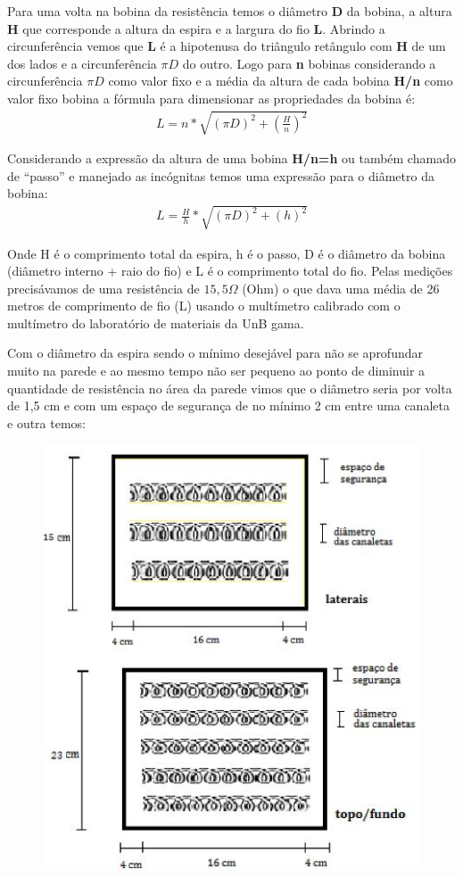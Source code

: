 Para uma volta na bobina da resistência temos o diâmetro \textbf{D} da bobina, a altura \textbf{H} que corresponde a altura da espira e a largura do fio \textbf{L}. Abrindo a circunferência vemos que \textbf{L} é a hipotenusa do triângulo retângulo com \textbf{H} de um dos lados e a circunferência \textbf{$\pi D$} do outro.
Logo para \textbf{n} bobinas considerando a circunferência \textbf{$\pi D$} como valor fixo e a média da altura de cada bobina \textbf{H/n} como valor fixo bobina  a fórmula para dimensionar as propriedades da bobina é:
\begin{gather}
    L = n * \sqrt{(\pi D)^{2} + \left(\frac{H}{n}\right)^{2}}
\end{gather}

Considerando a expressão da altura de uma bobina \textbf{H/n=h} ou também chamado de “passo” e manejado as incógnitas temos uma expressão para o diâmetro da bobina:
\begin{gather}
    L = \frac{H}{h} * \sqrt{(\pi D)^{2} + \left(h\right)^{2}}
\end{gather}

Onde H é o comprimento total da espira, h é o passo, D é o diâmetro da bobina (diâmetro interno + raio do fio) e L é o comprimento total do fio.
Pelas medições precisávamos de uma resistência de $15,5\Omega$ (Ohm) o que dava uma média de 26 metros de comprimento de fio (L) usando o multímetro calibrado com o multímetro do laboratório de materiais da UnB gama.

Com o diâmetro da espira sendo o mínimo desejável para não se aprofundar muito na parede e ao mesmo tempo não ser pequeno ao ponto de diminuir a quantidade de resistência no área da parede vimos que o diâmetro seria por volta de 1,5 cm e com um espaço de segurança de no mínimo 2 cm entre uma canaleta e outra temos:
\begin{figure}[H]
	\centering
	\label{resistencia2}
	\includegraphics[keepaspectratio=true,scale=1.0]{figuras/alimentacao4.JPG}
\end{figure}

